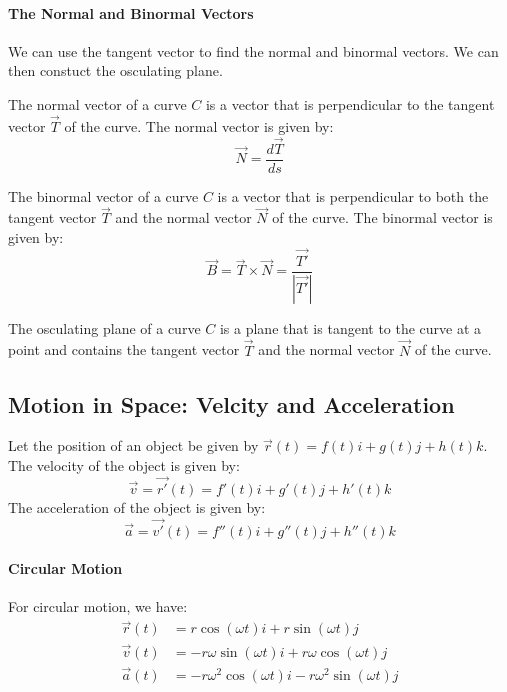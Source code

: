 \documentclass[11pt]{article}
\begin{document}
\paragraph{The Normal and Binormal Vectors} We can use the tangent vector to find the normal and binormal vectors. We can then constuct the osculating plane.
\begin{definition}
    The normal vector of a curve $C$ is a vector that is perpendicular to the tangent vector $\vec{T}$ of the curve. The normal vector is given by:
    \begin{equation}
        \vec{N} = \frac{d\vec{T}}{ds}
    \end{equation}
\end{definition}
\begin{definition}
    The binormal vector of a curve $C$ is a vector that is perpendicular to both the tangent vector $\vec{T}$ and the normal vector $\vec{N}$ of the curve. The binormal vector is given by:
    \begin{equation}
        \vec{B} = \vec{T} \times \vec{N} = \frac{\vec{T'}}{|\vec{T'}|}
    \end{equation}
\end{definition}
\begin{definition}
    The osculating plane of a curve $C$ is a plane that is tangent to the curve at a point and contains the tangent vector $\vec{T}$ and the normal vector $\vec{N}$ of the curve.
\end{definition}
\subsection{Motion in Space: Velcity and Acceleration}
\begin{definition}
    Let the position of an object be given by $\vec{r}(t) = f(t)i + g(t)j + h(t)k$. The velocity of the object is given by:
    \begin{equation}
        \vec{v} = \vec{r'}(t) = f'(t)i + g'(t)j + h'(t)k
    \end{equation}
    The acceleration of the object is given by:
    \begin{equation}
        \vec{a} = \vec{v'}(t) = f''(t)i + g''(t)j + h''(t)k
    \end{equation}
\end{definition}
\paragraph{Circular Motion} For circular motion, we have:
\begin{align}
    \vec{r}(t) &= r\cos(\omega t)i + r\sin(\omega t)j \\
    \vec{v}(t) &= -r\omega\sin(\omega t)i + r\omega\cos(\omega t)j \\
    \vec{a}(t) &= -r\omega^2\cos(\omega t)i - r\omega^2\sin(\omega t)j
\end{align}
\end{document}
